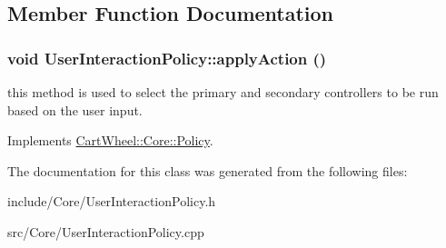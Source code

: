 \subsection{Member Function Documentation}
\hypertarget{classCartWheel_1_1Core_1_1UserInteractionPolicy_a1b896f869b8d484f552fc5da8a40923f}{
\subsubsection[{applyAction}]{\setlength{\rightskip}{0pt plus 5cm}void UserInteractionPolicy::applyAction ()}}
\label{classCartWheel_1_1Core_1_1UserInteractionPolicy_a1b896f869b8d484f552fc5da8a40923f}
this method is used to select the primary and secondary controllers to be run based on the user input. 

Implements \hyperlink{classCartWheel_1_1Core_1_1Policy_acccd1ec26392309eff12c565ae9fb8c7}{CartWheel::Core::Policy}.



The documentation for this class was generated from the following files:\begin{DoxyCompactItemize}
\item 
include/Core/UserInteractionPolicy.h\item 
src/Core/UserInteractionPolicy.cpp\end{DoxyCompactItemize}
